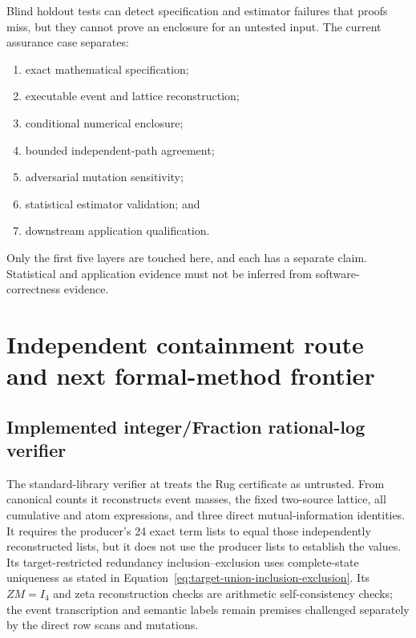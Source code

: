 \documentclass[11pt]{article}
\theoremstyle{definition}
\begin{document}
Blind holdout tests can detect specification and estimator failures that proofs miss, but they
cannot prove an enclosure for an untested input.  The current assurance case separates:
\begin{enumerate}[leftmargin=*]
  \item exact mathematical specification;
  \item executable event and lattice reconstruction;
  \item conditional numerical enclosure;
  \item bounded independent-path agreement;
  \item adversarial mutation sensitivity;
  \item statistical estimator validation; and
  \item downstream application qualification.
\end{enumerate}
Only the first five layers are touched here, and each has a separate claim.  Statistical and
application evidence must not be inferred from software-correctness evidence.

\section{Independent containment route and next formal-method frontier}

\subsection{Implemented integer/Fraction rational-log verifier}

The standard-library verifier at
 treats the Rug certificate as
untrusted.  From canonical counts it reconstructs event masses, the fixed two-source lattice,
all cumulative and atom expressions, and three direct mutual-information identities.  It requires
the producer's 24 exact term lists to equal those independently reconstructed lists, but it does
not use the producer lists to establish the values.  Its target-restricted redundancy
inclusion--exclusion uses complete-state uniqueness as stated in
Equation~\eqref{eq:target-union-inclusion-exclusion}.  Its \(ZM=I_4\) and zeta reconstruction
checks are arithmetic self-consistency checks; the event transcription and semantic labels remain
premises challenged separately by the direct row scans and mutations.
\end{document}

